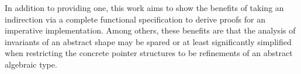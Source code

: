 In addition to providing one, this work aims to show the benefits
of taking an indirection via a complete functional specification
to derive proofs for an imperative implementation.
Among others, these benefits are that the analysis of invariants of an abstract shape may be spared
or at least significantly simplified when
restricting the concrete pointer structures to be refinements
of an abstract algebraic type.